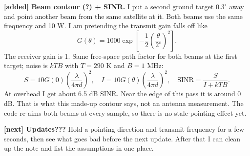 \documentclass{article}
\begin{document}
\medskip
\noindent\textbf{[added] Beam contour (?) + SINR.} I put a second ground target $0.3^\circ$ away and point another beam from the same satellite at it. Both beams use the same frequency and 10 W. I am pretending the transmit gain falls off like
\[
G(\theta)=1000\exp\!\left[-\frac12\left(\frac{\theta}{2^\circ}\right)^2\right].
\]
The receiver gain is 1. Same free-space path factor for both beams at the first target; noise is $kTB$ with $T=290$ K and $B=1$ MHz:
\[
S=10G(0)\left(\frac{\lambda}{4\pi d}\right)^2,\quad
I=10G(\theta)\left(\frac{\lambda}{4\pi d}\right)^2,\quad
\mathrm{SINR}=\frac{S}{I+kTB}.
\]
At overhead I get about 6.5 dB SINR. Near the edge of this pass it is around 0 dB. That is what this made-up contour says, not an antenna measurement. The code re-aims both beams at every sample, so there is no stale-pointing effect yet.

\medskip
\noindent\textbf{[next] Updates???} Hold a pointing direction and transmit frequency for a few seconds, then see what goes bad before the next update. After that I can clean up the note and list the assumptions in one place.
\end{document}
